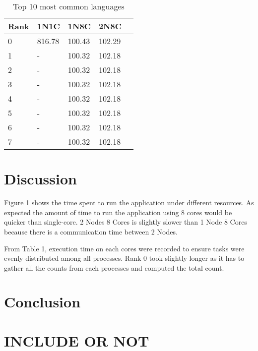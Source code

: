 \documentclass[11pt]{article}
\begin{document}
\begin{table}[h]
 \begin{center}
\begin{tabular}{|l|l|l|l|l|}

      \hline
      Rank &1N1C & 1N8C & 2N8C  \\
      \hline\hline
      0 & 816.78 & 100.43 & 102.29 \\
      1 & - & 100.32 & 102.18 \\
      2 & - & 100.32 & 102.18 \\
      3 & - & 100.32 & 102.18 \\
      4 & - & 100.32 & 102.18 \\
      5 & - & 100.32 & 102.18 \\
      6 & - & 100.32 & 102.18 \\
      7 & - & 100.32 & 102.18 \\

     \hline

\end{tabular}
\caption{Top 10 most common languages}\label{table2}
 \end{center}
\end{table}

\section{Discussion}

Figure 1 shows the time spent to run the application under different resources. As expected the amount of time to run the application using 8 cores would be quicker than single-core. 2 Nodes 8 Cores is slightly slower than 1 Node 8 Cores because there is a communication time between 2 Nodes. 

From Table 1, execution time on each cores were recorded to ensure tasks were evenly distributed among all processes. Rank 0 took slightly longer as it has to gather all the counts from each processes and computed the total count. 

\section{Conclusion}



\section{INCLUDE OR NOT}
\end{document}
